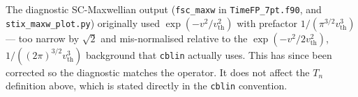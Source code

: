 \documentclass[11pt,a4paper]{article}
\begin{document}
The diagnostic SC-Maxwellian output (\texttt{fsc\_maxw} in
\texttt{TimeFP\_7pt.f90}, and \texttt{stix\_maxw\_plot.py}) originally used
$\exp(-v^2/v_\mathrm{th}^2)$ with prefactor $1/(\pi^{3/2}v_\mathrm{th}^3)$ ---
too narrow by $\sqrt2$ and mis-normalised relative to the
$\exp(-v^2/2v_\mathrm{th}^2)$, $1/((2\pi)^{3/2}v_\mathrm{th}^3)$ background that
\texttt{cblin} actually uses. This has since been corrected so the diagnostic
matches the operator. It does not affect the $T_n$ definition above, which is
stated directly in the \texttt{cblin} convention.
\end{document}
